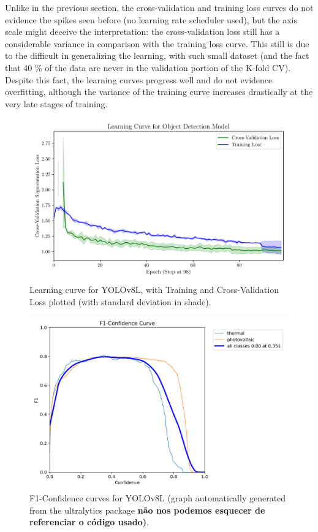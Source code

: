 \documentclass[conference]{IEEEtran}
\begin{document}
Unlike in the previous section, the cross-validation and training loss curves do not evidence the spikes seen before (no learning rate scheduler used), but the axis scale might deceive the interpretation: the cross-validation loss still has a considerable variance in comparison with the training loss curve. This still is due to the difficult in generalizing the learning, with such small dataset (and the fact that 40 \% of the data are never in the validation portion of the K-fold CV). Despite this fact, the learning curves progress well and do not evidence overfitting, although the variance of the training curve increases drastically at the very late stages of training.

\begin{figure}[H]
    \centering
    \includegraphics[width=1\linewidth]{assets/model03_lc.png}
    \caption{Learning curve for YOLOv8L, with
Training and Cross-Validation Loss plotted (with standard
deviation in shade).}
    \label{fig:model03_lc}
\end{figure}

\begin{figure}[H]
    \centering
    \includegraphics[width=1\linewidth]{assets/model03_yolof1.png}
    \caption{F1-Confidence curves for YOLOv8L (graph automatically generated from the ultralytics package \textbf{não nos podemos esquecer de referenciar o código usado)}.}
    \label{fig:model03_yolof1}
\end{figure}
\end{document}
